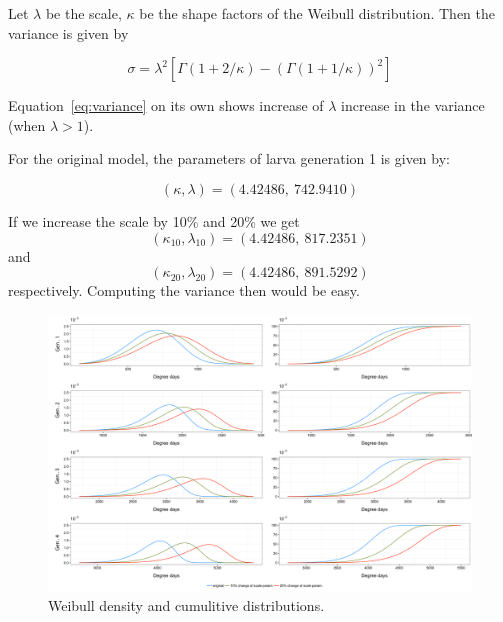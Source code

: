 \documentclass[12pt]{article}
\date{}
\theoremstyle{plain}
\theoremstyle{definition}
\theoremstyle{definition}
\begin{document}
 

Let $\lambda$ be the scale, $\kappa$ be the shape factors of
the Weibull distribution. Then the variance is given by

\begin{equation}
  \label{eq:variance}
\sigma = \lambda^2 [\Gamma(1 + 2/\kappa) - (\Gamma(1+1/\kappa))^2]
\end{equation}


Equation~\eqref{eq:variance} on its own shows increase 
of $\lambda$ increase in the variance (when $\lambda > 1$).

For the original model, the parameters of larva generation 1 is given by:

\[(\kappa, \lambda) = (4.42486, \:742.9410)\]

If we increase the scale by 10\% and 20\%
we get 
\[(\kappa_{10}, \lambda_{10}) = (4.42486,\: 817.2351)\] 
and 
\[(\kappa_{20}, \lambda_{20}) = (4.42486, \: 891.5292)\]
 respectively. Computing the variance then would be easy.

\begin{figure}[httb!]
  \centering
  \includegraphics[width=1\linewidth]{larva_weibull.png}
\caption{Weibull density and cumulitive distributions.}
\label{fig:degrootevolution}
\end{figure}
\end{document}
